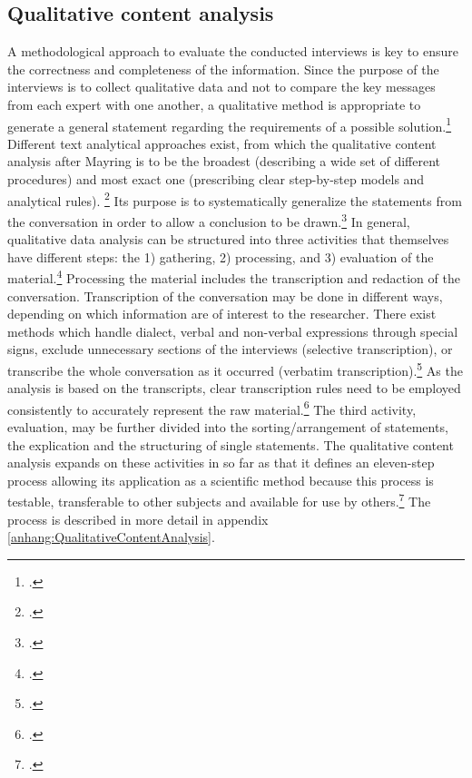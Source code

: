 \subsection{Qualitative content analysis} \label{subsec:Mayring}
A methodological approach to evaluate the conducted interviews is key to ensure the correctness and completeness of the information. Since the purpose of the interviews is to collect qualitative data and not to compare the key messages from each expert with one another, a qualitative method is appropriate to generate a general statement regarding the requirements of a possible solution.\footcite[Cf.][p.456]{MeuserExpertInneninterviewsvielfacherprobt1991} Different text analytical approaches exist, from which the qualitative content analysis after Mayring is to be the broadest (describing a wide set of different procedures) and most exact one (prescribing clear step-by-step models and analytical rules). \footcite[Cf.][p.197]{SteiglederstrukturierendequalitativeInhaltsanalyse2008} Its purpose is to systematically generalize the statements from the conversation in order to allow a conclusion to be drawn.\footcite[Cf.][p.13]{MayringQualitativeContentAnalysis2014}
In general, qualitative data analysis can be structured into three activities that themselves have different steps: the 1) gathering, 2) processing, and 3) evaluation of the material.\footcite[Cf.][p.135 et seqq]{KrugerqualitativeInhaltsanalyseMethode2004} Processing the material includes the transcription and redaction of the conversation. Transcription of the conversation may be done in different ways, depending on which information are of interest to the researcher. There exist methods which handle dialect, verbal and non-verbal expressions through special signs, exclude unnecessary sections of the interviews (selective transcription), or transcribe the whole conversation as it occurred (verbatim transcription).\footcite[Cf.][p.44 et seq]{MayringQualitativeContentAnalysis2014} As the analysis is based on the transcripts, clear transcription rules need to be employed consistently to accurately represent the raw material.\footcite[Cf.][p.44]{MayringQualitativeContentAnalysis2014} The third activity, evaluation, may be further divided into the sorting/arrangement of statements, the explication and the structuring of single statements. The qualitative content analysis expands on these activities in so far as that it defines an eleven-step process allowing its application as a scientific method because this process is testable, transferable to other subjects and available for use by others.\footcite[Cf.][p.53]{MayringQualitativeContentAnalysis2014} The process is described in more detail in appendix \ref{anhang:QualitativeContentAnalysis}.

